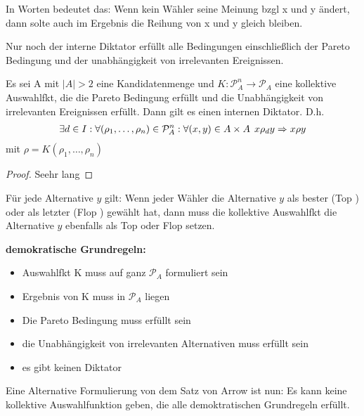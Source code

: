 In Worten bedeutet das: Wenn kein Wähler seine Meinung bzgl x und y ändert, dann solte auch im Ergebnis die Reihung von x und y gleich bleiben. 

Nur noch der interne Diktator erfüllt alle Bedingungen einschließlich der Pareto Bedingung und der unabhängigkeit von irrelevanten Ereignissen. 

\begin{thm}
	Es sei A mit $|A|>2$ eine Kandidatenmenge und $K:  \mathcal{P}_A^n \rightarrow \mathcal{P}_A$ eine kollektive Auswahlfkt, die die Pareto Bedingung erfüllt und die Unabhängigkeit von irrelevanten Ereignissen erfüllt. Dann gilt es einen internen Diktator. D.h.
	\begin{align*}
		\exists d \in I: \forall (\rho_1, \dots, \rho_n) \in \mathcal{P}_A^n : \forall (x,y) \in A \times A \hspace{1ex} x \rho_d y \Rightarrow x \rho y
	\end{align*}
	mit $\rho = K(\rho_1, \dots, \rho_n)$
\end{thm}
\begin{proof}
	Seehr lang
\end{proof}

\begin{lem}[Extremallemma]
	Für jede Alternative $y$ gilt: Wenn jeder Wähler die Alternative $y$ als bester (\glqq Top \grqq) oder als letzter (\glqq Flop \grqq) gewählt hat, dann muss die kollektive Auswahlfkt die Alternative $y$ ebenfalls als \glqq Top \grqq oder \glqq Flop \grqq setzen. 
\end{lem}

\begin{rem}
	\textbf{demokratische Grundregeln:}
	\begin{itemize}
		\item Auswahlfkt K muss auf ganz $\mathcal{P}_A$ formuliert sein
		\item Ergebnis von K muss in $\mathcal{P}_A$ liegen
		\item Die Pareto Bedingung muss erfüllt sein
		\item die Unabhängigkeit von irrelevanten Alternativen muss erfüllt sein
		\item es gibt keinen Diktator
	\end{itemize}
	
	Eine Alternative Formulierung von dem Satz von Arrow ist nun: Es kann keine kollektive Auswahlfunktion geben, die alle demoktratischen Grundregeln erfüllt. 
\end{rem}

